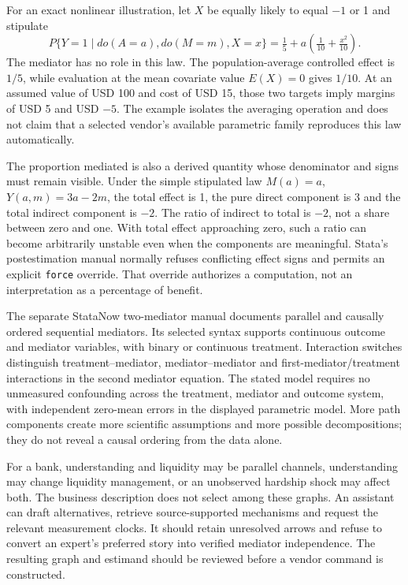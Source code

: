 For an exact nonlinear illustration, let $X$ be equally likely to equal $-1$ or 1 and stipulate
\begin{equation}
 P\{Y=1\mid do(A=a),do(M=m),X=x\}
   =\tfrac15+a\left(\tfrac1{10}+\tfrac{x^2}{10}\right).
 \label{exec20:med-population-law}
\end{equation}
The mediator has no role in this law. The population-average controlled effect is $1/5$, while evaluation at the mean covariate value $E(X)=0$ gives $1/10$. At an assumed value of USD 100 and cost of USD 15, those two targets imply margins of USD 5 and USD $-5$. The example isolates the averaging operation and does not claim that a selected vendor's available parametric family reproduces this law automatically.~\citep{exec20_med_reference}

The proportion mediated is also a derived quantity whose denominator and signs must remain visible. Under the simple stipulated law $M(a)=a$, $Y(a,m)=3a-2m$, the total effect is 1, the pure direct component is 3 and the total indirect component is $-2$. The ratio of indirect to total is $-2$, not a share between zero and one. With total effect approaching zero, such a ratio can become arbitrarily unstable even when the components are meaningful. Stata's postestimation manual normally refuses conflicting effect signs and permits an explicit \texttt{force} override. That override authorizes a computation, not an interpretation as a percentage of benefit.~\citep{exec20_med_stata_post,exec20_med_reference}

The separate StataNow two-mediator manual documents parallel and causally ordered sequential mediators. Its selected syntax supports continuous outcome and mediator variables, with binary or continuous treatment. Interaction switches distinguish treatment--mediator, mediator--mediator and first-mediator/treatment interactions in the second mediator equation. The stated model requires no unmeasured confounding across the treatment, mediator and outcome system, with independent zero-mean errors in the displayed parametric model. More path components create more scientific assumptions and more possible decompositions; they do not reveal a causal ordering from the data alone.~\citep{exec20_med_stata_multiple}

For a bank, understanding and liquidity may be parallel channels, understanding may change liquidity management, or an unobserved hardship shock may affect both. The business description does not select among these graphs. An assistant can draft alternatives, retrieve source-supported mechanisms and request the relevant measurement clocks. It should retain unresolved arrows and refuse to convert an expert's preferred story into verified mediator independence. The resulting graph and estimand should be reviewed before a vendor command is constructed.

